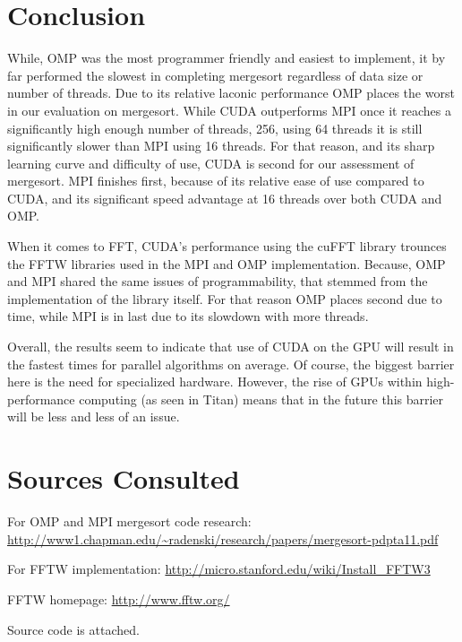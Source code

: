 \documentclass[conference,12pt]{IEEEtran}
\begin{document}
\section{Conclusion}
	While, OMP was the most programmer friendly and easiest to implement, it by far performed the slowest in completing mergesort regardless of data size or number of threads.  Due to its relative laconic performance OMP places the worst in our evaluation on mergesort.  While CUDA outperforms MPI once it reaches a significantly high enough number of threads, 256, using 64 threads it is still significantly slower than MPI using 16 threads.  For that reason, and its sharp learning curve and difficulty of use, CUDA is second for our assessment of mergesort.  MPI finishes first, because of its relative ease of use compared to CUDA, and its significant speed advantage at 16 threads over both CUDA and OMP.

	When it comes to FFT, CUDA's performance using the cuFFT library trounces the FFTW libraries used in the MPI and OMP implementation. Because, OMP and MPI shared the same issues of programmability, that stemmed from the implementation of the library itself.  For that reason OMP places second due to time, while MPI is in last due to its slowdown with more threads.  

	Overall, the results seem to indicate that use of CUDA on the GPU will result in the fastest times for parallel algorithms on average. Of course, the biggest barrier here is the need for specialized hardware.  However, the rise of GPUs within high-performance computing (as seen in Titan) means that in the future this barrier will be less and less of an issue.

\section{Sources Consulted}
	For OMP and MPI mergesort code research:
	\url{http://www1.chapman.edu/~radenski/research/papers/mergesort-pdpta11.pdf}

	For FFTW implementation:
	\url{http://micro.stanford.edu/wiki/Install\_FFTW3}

	FFTW homepage:
	\url{http://www.fftw.org/}

\appendix
	Source code is attached.\\
	\onecolumn

	
	\pagebreak
	
	
	
	\pagebreak
	
\end{document}
